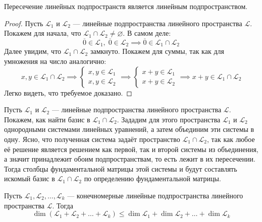 \documentclass[11pt]{article}
\begin{document}
\begin{lemma}
    Пересечение линейных подпространств является линейным подпространством.
\end{lemma}

\begin{proof}
    Пусть $\mathcal{L}_1$ и $\mathcal{L}_2$ --- линейные подпространства линейного пространства $\mathcal{L}$. Покажем 
    для начала, что $\mathcal{L}_1 \cap \mathcal{L}_2 \neq \varnothing$. В самом деле:
    \[\overline{0} \in \mathcal{L}_1, \; \overline{0} \in \mathcal{L}_2 \implies \overline{0} \in \mathcal{L}_1 \cap \mathcal{L}_2\]
    Далее увидим, что $\mathcal{L}_1 \cap \mathcal{L}_2$ замкнуто. Покажем для суммы, так как для умножения на число аналогично:
    \begin{equation*}
        x, y \in \mathcal{L}_1 \cap \mathcal{L}_2
        \implies
        \begin{cases}
            x, y \in \mathcal{L}_1 \\
            x, y \in \mathcal{L}_2
        \end{cases}
        \implies 
        \begin{cases}
            x + y \in \mathcal{L}_1 \\
            x + y \in \mathcal{L}_2
        \end{cases}
        \implies
        x + y \in \mathcal{L}_1 \cap \mathcal{L}_2
    \end{equation*}
    Легко видеть, что требуемое доказано.
\end{proof}

\begin{remark}
    Пусть $\mathcal{L}_1$ и $\mathcal{L}_2$ --- линейные подпространства линейного пространства $\mathcal{L}$.
    Покажем, как найти базис в $\mathcal{L}_1 \cap \mathcal{L}_2$. 
    Зададим для этого пространства $\mathcal{L}_1$ и $\mathcal{L}_2$
    однородными системами линейных уравнений, а затем объединим эти системы в одну. Ясно, что полученная система задаёт 
    пространство $\mathcal{L}_1 \cap \mathcal{L}_2$, так как любое её решение является решением как первой, так и второй системы из объединения, а значит 
    принадлежит обоим подпространствам, то есть лежит в их пересечении. Тогда столбцы фундаментальной матрицы этой системы и будут составлять искомый базис в $\mathcal{L}_1 \cap \mathcal{L}_2$ по 
    определению фундаментальной матрицы.
\end{remark}

\begin{lemma}
    Пусть $\mathcal{L}_1, \mathcal{L}_2, \ldots, \mathcal{L}_k$ --- конечномерные линейные подпространства линейного пространства $\mathcal{L}$. Тогда
    \[\dim \left(\mathcal{L}_1 + \mathcal{L}_2 + \ldots + \mathcal{L}_k\right) \leq \dim \mathcal{L}_1 + \dim \mathcal{L}_2 + \ldots + \dim \mathcal{L}_k\]
\end{lemma}
\end{document}
